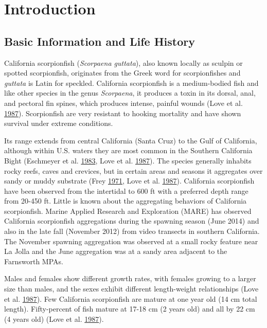 \documentclass[12pt,]{article}
\begin{document}

\section{Introduction}\label{introduction}

\subsection{Basic Information and Life
History}\label{basic-information-and-life-history}

California scorpionfish (\emph{Scorpaena guttata}), also known locally
as sculpin or spotted scorpionfish, originates from the Greek word for
scorpionfishes and \emph{guttata} is Latin for speckled. California
scorpionfish is a medium-bodied fish and like other species in the genus
\emph{Scorpaena}, it produces a toxin in its dorsal, anal, and pectoral
fin spines, which produces intense, painful wounds (Love et al.
\protect\hyperlink{ref-Love1987}{1987}). Scorpionfish are very resistant
to hooking mortality and have shown survival under extreme conditions.

Its range extends from central California (Santa Cruz) to the Gulf of
California, although within U.S. waters they are most common in the
Southern California Bight (Eschmeyer et al.
\protect\hyperlink{ref-Eschmeyer1983}{1983}, Love et al.
\protect\hyperlink{ref-Love1987}{1987}). The species generally inhabits
rocky reefs, caves and crevices, but in certain areas and seasons it
aggregates over sandy or muddy substrate (Frey
\protect\hyperlink{ref-Frey1971}{1971}, Love et al.
\protect\hyperlink{ref-Love1987}{1987}). California scorpionfish have
been observed from the intertidal to 600 ft with a preferred depth range
from 20-450 ft. Little is known about the aggregating behaviors of
California scorpionfish. Marine Applied Research and Exploration (MARE)
has observed California scorpionfish aggregations during the spawning
season (June 2014) and also in the late fall (November 2012) from video
transects in southern California. The November spawning aggregation was
observed at a small rocky feature near La Jolla and the June aggregation
was at a sandy area adjacent to the Farnsworth MPAs.

Males and females show different growth rates, with females growing to a
larger size than males, and the sexes exhibit different length-weight
relationships (Love et al. \protect\hyperlink{ref-Love1987}{1987}). Few
California scorpionfish are mature at one year old (14 cm total length).
Fifty-percent of fish mature at 17-18 cm (2 years old) and all by 22 cm
(4 years old) (Love et al. \protect\hyperlink{ref-Love1987}{1987}).
\end{document}
